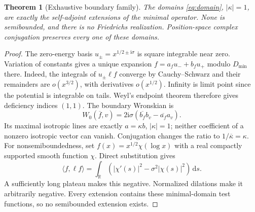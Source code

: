 \documentclass[10pt]{article}
\newcommand{\ii}{\mathrm i}
\newcommand{\dd}{\,\mathrm d}
\newcommand{\R}{\mathbb R}
\newtheorem{theorem}{Theorem}
\begin{document}
\begin{theorem}[Exhaustive boundary family]
The domains \eqref{eq:domain}, $|\kappa|=1$, are exactly the self-adjoint
extensions of the minimal operator. None is semibounded, and there is no
Friedrichs realization. Position-space complex conjugation preserves every
one of these domains.
\end{theorem}
\begin{proof}
The zero-energy basis $u_\pm=x^{1/2\pm\ii\sigma}$ is square integrable
near zero. Variation of constants gives a unique expansion
$f=a_fu_-+b_fu_+$ modulo $D_{\min}$ there.
Indeed, the integrals of $u_\pm\ell f$ converge by Cauchy--Schwarz and
their remainders are $o(x^{3/2})$, with derivatives $o(x^{1/2})$.
Infinity is limit point since the potential is integrable on tails.
Weyl's endpoint theorem therefore gives deficiency indices $(1,1)$.
The boundary Wronskian is
\[
 W_0(\overline f,v)=2\ii\sigma
 (\overline{b_f}b_v-\overline{a_f}a_v).
\]
Its maximal isotropic lines are exactly $a=\kappa b$, $|\kappa|=1$;
neither coefficient of a nonzero isotropic vector can vanish.
Conjugation changes the ratio to $1/\overline\kappa=\kappa$.
For nonsemiboundedness, set $f(x)=x^{1/2}\chi(\log x)$ with a real compactly
supported smooth function $\chi$. Direct substitution gives
\[
 \langle f,\ell f\rangle=\int_{\R}
 (|\chi'(s)|^2-\sigma^2|\chi(s)|^2)\dd s.
\]
A sufficiently long plateau makes this negative. Normalized dilations make
it arbitrarily negative. Every extension contains these minimal-domain
test functions, so no semibounded extension exists.
\end{proof}
\end{document}
